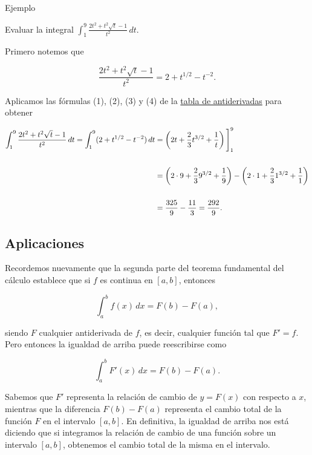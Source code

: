\documentclass[
  letterpaper,
]{book}
\theoremstyle{plain}
\theoremstyle{remark}
\begin{document}
Ejemplo

Evaluar la integral
\(\displaystyle \int_1^9 \frac{2t^2+t^2\sqrt{t}-1}{t^2}\,dt\).

\begin{tcolorbox}[enhanced jigsaw, opacityback=0, left=2mm, opacitybacktitle=0.6, toprule=.15mm, bottomrule=.15mm, colbacktitle=quarto-callout-tip-color!10!white, titlerule=0mm, bottomtitle=1mm, title=\textcolor{quarto-callout-tip-color}{\faLightbulb}\hspace{0.5em}{Solución}, toptitle=1mm, colframe=quarto-callout-tip-color-frame, colback=white, breakable, rightrule=.15mm, arc=.35mm, leftrule=.75mm, coltitle=black]

Primero notemos que

\[
\frac{2t^2+t^2\sqrt{t}-1}{t^2}=2+t^{1/2}-t^{-2}.
\]

Aplicamos las fórmulas (1), (2), (3) y (4) de la
\hyperref[form-int-indefinidas]{tabla de antiderivadas} para obtener

\[
\begin{aligned}
\int_1^9  \frac{2t^2+t^2\sqrt{t}-1}{t^2}\,dt=\int_1^9 (2+t^{1/2}-t^{-2})\,dt &=\left(2t+\frac{2}{3}t^{3/2}+\frac{1}{t}\right)\Bigg{]}_1^9\\
\\
&=\left(2\cdot 9+\frac{2}{3}9^{3/2}+\frac{1}{9}\right)-\left(2\cdot 1+\frac{2}{3}1^{3/2}+\frac{1}{1}\right)\\
\\
&=\frac{325}{9}-\frac{11}{3}=\frac{292}{9}.
\end{aligned}
\]

\end{tcolorbox}

\subsection{Aplicaciones}\label{aplicaciones}

Recordemos nuevamente que la segunda parte del teorema fundamental del
cálculo establece que si \(f\) es continua en \([a,b]\), entonces

\[
\int_a^bf(x)\,dx=F(b)-F(a),
\]

siendo \(F\) cualquier antiderivada de \(f\), es decir, cualquier
función tal que \(F'=f\). Pero entonces la igualdad de arriba puede
reescribirse como

\[
\int_a^bF'(x)\,dx=F(b)-F(a).
\]

Sabemos que \(F'\) representa la relación de cambio de \(y=F(x)\) con
respecto a \(x\), mientras que la diferencia \(F(b)-F(a)\) representa el
cambio total de la función \(F\) en el intervalo \([a,b]\). En
definitiva, la igualdad de arriba nos está diciendo que si integramos la
relación de cambio de una función sobre un intervalo \([a,b]\),
obtenemos el cambio total de la misma en el intervalo.
\end{document}
